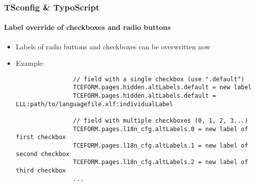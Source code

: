 
\begin{frame}[fragile]
	\frametitle{TSconfig \& TypoScript}
	\framesubtitle{Label override of checkboxes and radio buttons}

	\lstset{basicstyle=\tiny\ttfamily}

	\begin{itemize}

		\item Labels of radio buttons and checkboxes can be overwritten now
		\item Example:

			\begin{lstlisting}
				// field with a single checkbox (use ".default")
				TCEFORM.pages.hidden.altLabels.default = new label
				TCEFORM.pages.hidden.altLabels.default = LLL:path/to/languagefile.xlf:individualLabel

				// field with multiple checkboxes (0, 1, 2, 3...)
				TCEFORM.pages.l18n_cfg.altLabels.0 = new label of first checkbox
				TCEFORM.pages.l18n_cfg.altLabels.1 = new label of second checkbox
				TCEFORM.pages.l18n_cfg.altLabels.2 = new label of third checkbox
				...
			\end{lstlisting}

	\end{itemize}

\end{frame}


